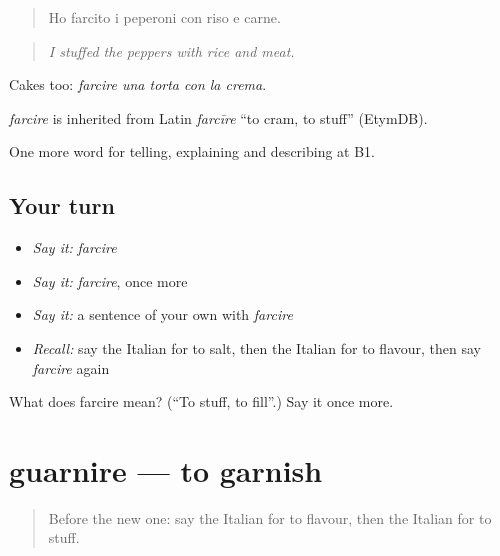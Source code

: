 \begin{quote}
Ho farcito i peperoni con riso e carne.
\end{quote}

\begin{quote}
\emph{I stuffed the peppers with rice and meat.}
\end{quote}

Cakes too: \emph{farcire una torta con la crema}.

\begin{cousinweb}
\emph{farcire} is inherited from Latin \emph{farcīre} \textquotedblleft{}to cram, to stuff\textquotedblright{} (EtymDB).
\end{cousinweb}

\begin{grammarlens}[title={What you've built}]
One more word for telling, explaining and describing at B1.
\end{grammarlens}

\subsection*{Your turn}
\begin{itemize}
\raggedright
  \item \emph{Say it:} \emph{farcire}
  \item \emph{Say it:} \emph{farcire}, once more
  \item \emph{Say it:} a sentence of your own with \emph{farcire}
  \item \emph{Recall:} say the Italian for to salt, then the Italian for to flavour, then say \emph{farcire} again
\end{itemize}

\begin{tcolorbox}[breakable,colback=teal!4,colframe=teal!35!black,title={Before you move on}]
What does farcire mean? (\textquotedblleft{}To stuff, to fill\textquotedblright{}.) Say it once more.
\end{tcolorbox}
\section[guarnire]{guarnire — to garnish}

\label{lesson:IT-C337-guarnire}



\begin{quote}
Before the new one: say the Italian for to flavour, then the Italian for to stuff.
\end{quote}

